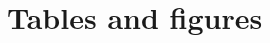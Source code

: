 \documentclass[a4paper,fleqn]{cas-sc}
\begin{document}
\section{Tables and figures}





\end{document}
